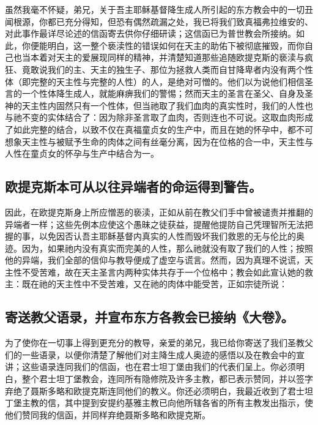虽然我毫不怀疑，弟兄，关于吾主耶稣基督降生成人所引起的东方教会中的一切丑闻根源，你都已充分得知，但恐有偶然疏漏之处，我已将我们致真福弗拉维安的、对此事作最详尽论述的信函寄去供你仔细研读；这信函已为普世教会所接纳。如此，你便能明白，这一整个亵渎性的错误如何在天主的助佑下被彻底摧毁，而你自己也当本着对天主的爱展现同样的精神，并清楚知道那些追随欧提克斯的亵渎与疯狂、竟敢说我们的主、天主的独生子、那位为拯救人类而自甘降卑者内没有两个性体（即完整的天主性与完整的人性）的人，是绝对可憎的。他们以为说他们相信圣言的一个性体降生成人，就能麻痹我们的警惕；然而天主的圣言在圣父、自身及圣神的天主性内固然只有一个性体，但当祂取了我们血肉的真实性时，我们的人性也与祂不变的实体结合了：因为除非圣言取了血肉，否则连也不可说。这取血肉形成了如此完整的结合，以致不仅在真福童贞女的生产中，而且在她的怀孕中，都不可想象天主性与被赋予生命的肉体之间有丝毫分离，因为在位格的合一中，天主性与人性在童贞女的怀孕与生产中结合为一。\par


\subsection{欧提克斯本可从以往异端者的命运得到警告。}

因此，在欧提克斯身上所应憎恶的亵渎，正如从前在教父们手中曾被谴责并推翻的异端者一样；这些先例本应使这个愚昧之徒获益，提醒他提防自己凭理智所无法把握的事，以免因否认吾主耶稣基督内真实的人性而毁坏我们救恩的无与伦比的奥迹。因为，如果祂内没有真实而完美的人性，那么祂就没有取了我们的人性；按照他的异端，我们全部的信仰与教导便成了虚空与谎言。然而，因为真理不说谎，天主性不受苦难，故在天主圣言内两种实体共存于一个位格中；教会如此宣认她的救主：既在祂的天主性中不受苦难，又在祂的肉体中能受苦，正如宗徒所说：\par


\subsection{寄送教父语录，并宣布东方各教会已接纳《大卷》。}

为了使你在一切事上得到更充分的教导，亲爱的弟兄，我已给你寄送了我们圣教父们的一些语录，以便你清楚了解他们对主降生成人奥迹的感悟以及在教会中的宣讲；这些语录连同我们的信函，也在君士坦丁堡由我们的代表们呈上。你必须明白，整个君士坦丁堡教会，连同所有隐修院及许多主教，都已表示赞同，并以签字弃绝了聂斯多略和欧提克斯连同他们的教义。你还必须明白，我最近收到了君士坦丁堡主教的信，其中提到安提约基雅主教已向他所辖各省的所有主教发出指示，使他们赞同我的信函，并同样弃绝聂斯多略和欧提克斯。\par

